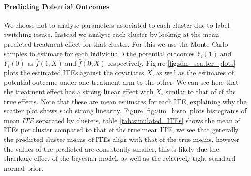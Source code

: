 \documentclass{article}
\begin{document}
\paragraph{Predicting Potential Outcomes} We choose not to analyse parameters associated to each cluster due to label switching issues. Instead we analyse each cluster by looking at the mean predicted treatment effect for that cluster. For this we use the Monte Carlo samples to estimate for each individual $i$ the potential outcomes $Y_i(1)$ and $Y_i(0)$ as $\hat{f}(1,X)$ and $\hat{f}(0,X)$ respectively. Figure \ref{fig:sim_scatter_plots} plots the estimated ITEs against the covariates $X$, as well as the estimates of potential outcome under one treatment arm to the other. We can see here that the treatment effect has a strong linear effect with $X$, similar to that of of the true effects. Note that these are mean estimates for each ITE, explaining why the scatter plot shows such strong linearity. Figure \ref{fig:sim_histo} plots histograms of mean $ITE$ separated by clusters, table \ref{tab:simulated_ITEs} shows the mean of ITEs per cluster compared to that of the true mean ITE, we see that generally the predicted cluster means of ITEs align with that of the true means, however the values of the predicted are consistently smaller, this is likely due the shrinkage effect of the bayesian model, as well as the relatively tight standard normal prior.
\end{document}
